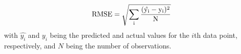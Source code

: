 $$\rm{RMSE}=\sqrt{\sum\limits_{i}\frac{(\hat{y_i}-y_i)^2}{N}}$$
with $\hat{y_i}$ and $y_i$ being the predicted and actual values for the $i$th data point, respectively, and $N$ being the number of observations.